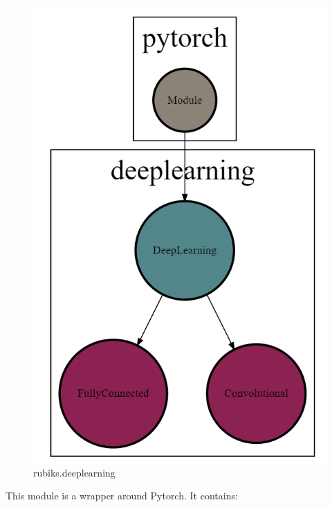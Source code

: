 \begin{figure}[H]
\centering
\includegraphics[scale=0.25]{./Figures/codebasedeeplearning}
\caption[Codebase]{rubiks.deeplearning}
\label{fig:Codebasedeeplearning}
\end{figure}
This module is a wrapper around Pytorch. It contains:

